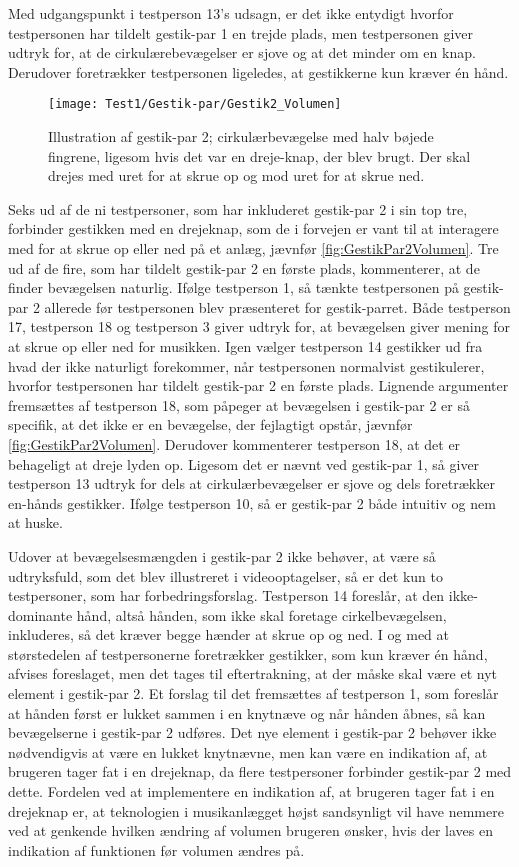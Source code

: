 Med udgangspunkt i testperson 13’s udsagn, er det ikke entydigt hvorfor testpersonen har tildelt gestik-par 1 en trejde plads, men testpersonen giver udtryk for, at de cirkulærebevægelser er sjove og at det minder om en knap. Derudover foretrækker testpersonen ligeledes, at gestikkerne kun kræver én hånd.
%
\begin{figure}[H]
	\centering
	\texttt{[image: Test1/Gestik-par/Gestik2\_Volumen]}
	\caption{Illustration af gestik-par 2; cirkulærbevægelse med halv bøjede fingrene, ligesom hvis det var en dreje-knap, der blev brugt. Der skal drejes med uret for at skrue op og mod uret for at skrue ned.}
	\label{fig:GestikPar2Volumen}
\end{figure}
\noindent
%
Seks ud af de ni testpersoner, som har inkluderet gestik-par 2 i sin top tre, forbinder gestikken med en drejeknap, som de i forvejen er vant til at interagere med for at skrue op eller ned på et anlæg, jævnfør \autoref{fig:GestikPar2Volumen}. Tre ud af de fire, som har tildelt gestik-par 2 en første plads, kommenterer, at de finder bevægelsen naturlig. Ifølge testperson 1, så tænkte testpersonen på gestik-par 2 allerede før testpersonen blev præsenteret for gestik-parret. Både testperson 17, testperson 18 og testperson 3 giver udtryk for, at bevægelsen giver mening for at skrue op eller ned for musikken. Igen vælger testperson 14 gestikker ud fra hvad der ikke naturligt forekommer, når testpersonen normalvist gestikulerer, hvorfor testpersonen har tildelt gestik-par 2 en første plads. Lignende argumenter fremsættes af testperson 18, som påpeger at bevægelsen i gestik-par 2 er så specifik, at det ikke er en bevægelse, der fejlagtigt opstår, jævnfør \autoref{fig:GestikPar2Volumen}. Derudover kommenterer testperson 18, at det er behageligt at dreje lyden op. Ligesom det er nævnt ved gestik-par 1, så giver testperson 13 udtryk for dels at cirkulærbevægelser er sjove og dels foretrækker en-hånds gestikker. Ifølge testperson 10, så er gestik-par 2 både intuitiv og nem at huske.

Udover at bevægelsesmængden i gestik-par 2 ikke behøver, at være så udtryksfuld, som det blev illustreret i videooptagelser, så er det kun to testpersoner, som har forbedringsforslag. Testperson 14 foreslår, at den ikke-dominante hånd, altså hånden, som ikke skal foretage cirkelbevægelsen, inkluderes, så det kræver begge hænder at skrue op og ned. I og med at størstedelen af testpersonerne foretrækker gestikker, som kun kræver én hånd, afvises foreslaget, men det tages til eftertrakning, at der måske skal være et nyt element i gestik-par 2. Et forslag til det fremsættes af testperson 1, som foreslår at hånden først er lukket sammen i en knytnæve og når hånden åbnes, så kan bevægelserne i gestik-par 2 udføres. Det nye element i gestik-par 2 behøver ikke nødvendigvis at være en lukket knytnævne, men kan være en indikation af, at brugeren tager fat i en drejeknap, da flere testpersoner forbinder gestik-par 2 med dette. Fordelen ved at implementere en indikation af, at brugeren tager fat i en drejeknap er, at teknologien i musikanlægget højst sandsynligt vil have nemmere ved at genkende hvilken ændring af volumen brugeren ønsker, hvis der laves en indikation af funktionen før volumen ændres på. 

